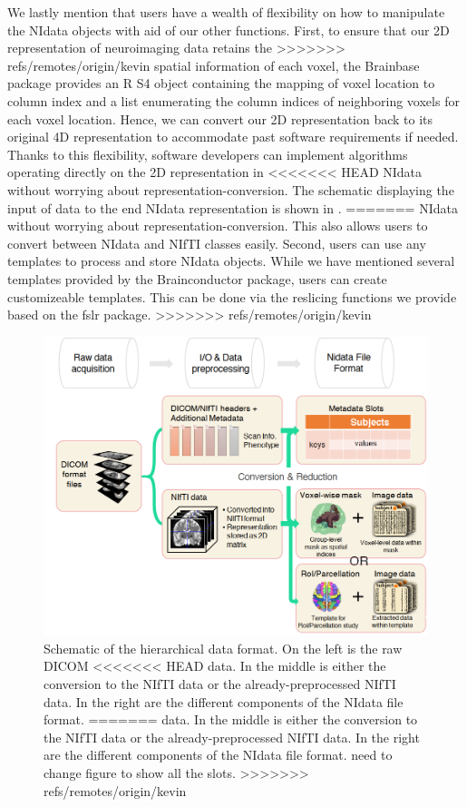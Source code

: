 \documentclass{nature}
\begin{document}
We lastly mention that users have a wealth of flexibility on how to manipulate the NIdata
objects with aid of our other functions. 
First, to ensure that our 2D representation of neuroimaging data retains the
>>>>>>> refs/remotes/origin/kevin
spatial information of each voxel, the Brainbase package provides
an R S4 object containing the mapping of voxel location to column index and
a list enumerating the column indices of neighboring voxels for each voxel
location. Hence, we can convert our 2D representation back to its original
4D representation to accommodate past software requirements if needed.
Thanks to this flexibility, software developers can
implement algorithms operating directly on the 2D representation in
<<<<<<< HEAD
NIdata without worrying about representation-conversion.  The
schematic displaying the input of data to the end NIdata representation
is shown in .
=======
NIdata without worrying about representation-conversion. This also allows users 
to convert between NIdata and NIfTI classes easily. Second, users can use any
templates to process and store NIdata objects. While we have mentioned several templates
provided by the Brainconductor package, users can create customizeable templates. 
This can be done via the reslicing
functions
we provide based on the fslr package. 
>>>>>>> refs/remotes/origin/kevin

\begin{figure}[tb]
\centering
\includegraphics[width=400pt]{fig/brainconductor/file_format.png}
\caption{Schematic of the hierarchical data format. On the left is the raw DICOM
<<<<<<< HEAD
data. In the middle is either the conversion to the NIfTI data or the already-preprocessed
NIfTI data. In the right are the different components of the NIdata file format. %
=======
data. In the middle is either the conversion to the NIfTI data or the
already-preprocessed
NIfTI data. In the right are the different components of the NIdata file format.
{\color{red}need to change figure to show all the slots. }
>>>>>>> refs/remotes/origin/kevin
}
\label{fig:fileformat}
\end{figure}
\end{document}
